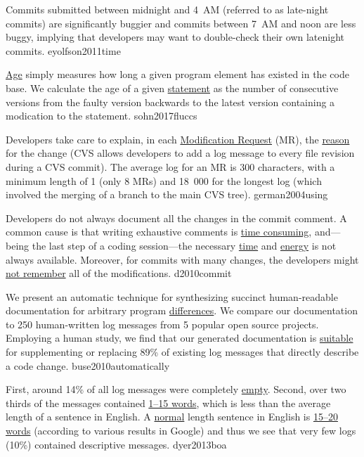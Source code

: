 \documentclass{article}
\begin{document}
  {Commits submitted between midnight and 4~AM (referred to as late-night commits) are significantly buggier and commits between 7~AM and noon are less buggy, implying that developers may want to double-check their own latenight commits.}
  {eyolfson2011time}

  {\ul{Age} simply measures how long a given program element has existed in the code base. We calculate the age of a given \ul{statement} as the number of consecutive versions from the faulty version backwards to the latest version containing a modication to the statement.}
  {sohn2017fluccs}


  {Developers take care to explain, in each \ul{Modification Request} (MR), the \ul{reason} for the change (CVS allows developers to add a log message to every file revision during a CVS commit). The average log for an MR is 300 characters, with a minimum length of 1 (only 8 MRs) and 18~000 for the longest log (which involved the merging of a branch to the main CVS tree).}
  {german2004using}

  {Developers do not always document all the changes in the commit comment. A common cause is that writing exhaustive comments is \ul{time consuming}, and---being the last step of a coding session---the necessary \ul{time} and \ul{energy} is not always available. Moreover, for commits with many changes, the developers might \ul{not remember} all of the modifications.}
  {d2010commit}

  {We present an automatic technique for synthesizing succinct human-readable documentation for arbitrary program \ul{differences}. We compare our documentation to 250 human-written log messages from 5 popular open source projects. Employing a human study, we find that our generated documentation is \ul{suitable} for supplementing or replacing 89\% of existing log messages that directly describe a code change.}
  {buse2010automatically}

  {First, around 14\% of all log messages were completely \ul{empty}. Second, over two thirds of the messages contained \ul{1–15 words}, which is less than the average length of a sentence in English. A \ul{normal} length sentence in English is \ul{15–20 words} (according to various results in Google) and thus we see that very few logs (10\%) contained descriptive messages.}
  {dyer2013boa}
\end{document}

